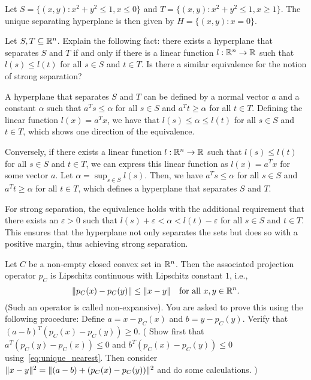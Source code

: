 \begin{solution}
  Let $S = \{ (x, y) : x^2 + y^2 \leq 1, x \leq 0 \}$ and $T = \{ (x, y) : x^2 + y^2 \leq 1, x \geq 1 \}$.
  The unique separating hyperplane is then given by $H = \{ (x, y) : x = 0 \}$.
\end{solution}

\begin{exercise}
  Let $S,T \subseteq \R^n$.
  Explain the following fact: there exists a hyperplane that separates $S$ and $T$ if and only if there is a linear function $l: \R^n \to \R$ such that $l(s) \leq l(t)$ for all $s \in S$ and $t \in T$.
  Is there a similar equivalence for the notion of strong separation?
\end{exercise}

\begin{solution}
  A hyperplane that separates $S$ and $T$ can be defined by a normal vector $a$ and a constant $\alpha$ such that $a^T s \leq \alpha$ for all $s \in S$ and $a^T t \geq \alpha$ for all $t \in T$.
  Defining the linear function $l(x) = a^T x$, we have that $l(s) \leq \alpha \leq l(t)$ for all $s \in S$ and $t \in T$, which shows one direction of the equivalence.

  Conversely, if there exists a linear function $l: \R^n \to \R$ such that $l(s) \leq l(t)$ for all $s \in S$ and $t \in T$, we can express this linear function as $l(x) = a^T x$ for some vector $a$.
  Let $\alpha = \sup_{s \in S} l(s)$.
  Then, we have $a^T s \leq \alpha$ for all $s \in S$ and $a^T t \geq \alpha$ for all $t \in T$, which defines a hyperplane that separates $S$ and $T$.

  For strong separation, the equivalence holds with the additional requirement that there exists an $\varepsilon > 0$ such that $l(s) + \varepsilon < \alpha < l(t) - \varepsilon$ for all $s \in S$ and $t \in T$.
  This ensures that the hyperplane not only separates the sets but does so with a positive margin, thus achieving strong separation.
\end{solution}

\begin{exercise}
  Let $C$ be a non-empty closed convex set in $\R^n$.
  Then the associated projection operator $p_C$ is Lipschitz continuous with Lipschitz constant $1$, i.e.,
  \begin{equation}
    \norm*{p_C(x) - p_C(y)} \leq \norm{x - y} \quad \text{for all } x, y \in \R^n.
  \end{equation}
  (Such an operator is called non-expansive).
  You are asked to prove this using the following procedure:
  Define $a = x - p_C(x)$ and $b = y - p_C(y)$.
  Verify that $(a - b)^T (p_C(x) - p_C(y)) \geq 0$.
  (%
    Show first that $a^T (p_C(y) - p_C(x)) \leq 0$ and $b^T (p_C(x) - p_C(y)) \leq 0$ using~\eqref{eq:unique_nearest}.
    Then consider $\norm{x - y}^2 = \norm{(a - b) + (p_C(x) - p_C(y))}^2$ and do some calculations.%
  )
\end{exercise}

